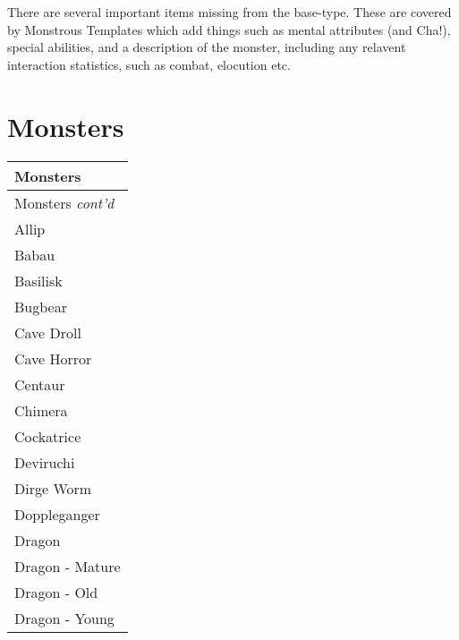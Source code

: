 \documentclass[twoside]{book}
\begin{document}
    {  
     There are several important items missing from the
               base-type. These are covered by Monstrous Templates which
               add things such as mental attributes (and Cha!), special
               abilities, and a description of the monster, including any
               relavent interaction statistics, such as combat, elocution
               etc. 
    }
  
    

\section{Monsters}
    
\begin{longtable}{p{1.25in}} 
  Monsters
  \\
  \hline
  \hline
  \endfirsthead
  Monsters \textit{cont'd}
        
  \\
  \hline
  \endhead
      
  \raggedright
           Allip 
  \tabularnewline
      
  \raggedright
           Babau 
  \tabularnewline
      
  \raggedright
           Basilisk 
  \tabularnewline
      
  \raggedright
           Bugbear 
  \tabularnewline
      
  \raggedright
           Cave Droll 
  \tabularnewline
      
  \raggedright
           Cave Horror 
  \tabularnewline
      
  \raggedright
           Centaur 
  \tabularnewline
      
  \raggedright
           Chimera 
  \tabularnewline
      
  \raggedright
           Cockatrice 
  \tabularnewline
      
  \raggedright
           Deviruchi 
  \tabularnewline
      
  \raggedright
           Dirge Worm 
  \tabularnewline
      
  \raggedright
           Doppleganger 
  \tabularnewline
      
  \raggedright
           Dragon 
  \tabularnewline
      
  \raggedright
           Dragon - Mature 
  \tabularnewline
      
  \raggedright
           Dragon - Old 
  \tabularnewline
      
  \raggedright
           Dragon - Young 
  \tabularnewline
      

\end{longtable}
\end{document}
